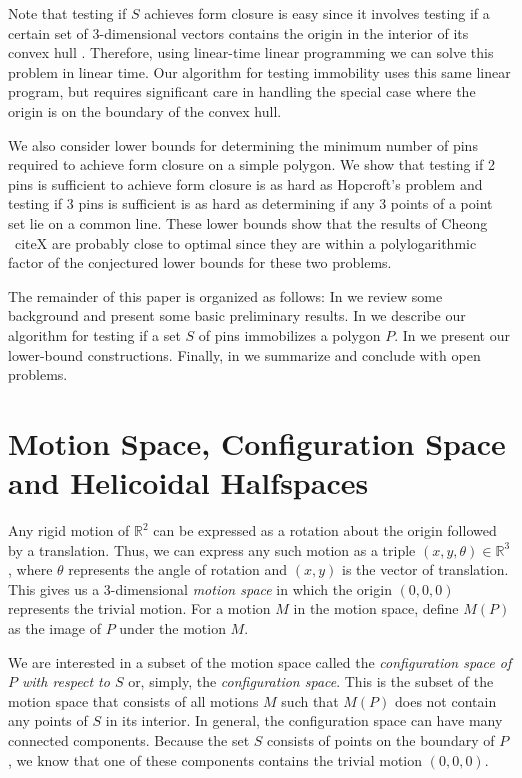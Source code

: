 \documentclass[lotsofwhite,charterfonts]{patmorin}
\newcommand{\Rtwo}{\mathbb{R}^2}
\begin{document}
Note that testing if $S$ achieves form closure is easy since it involves
testing if a certain set of 3-dimensional vectors contains the origin in the
interior of its convex hull \cite{A,B,C,D}.  Therefore, using linear-time
linear programming \cite{X,X} we can solve this problem in linear time.  Our
algorithm for testing immobility uses this same linear program, but requires
significant care in handling the special case where the origin is on the
boundary of the convex hull. 

We also consider lower bounds for determining the minimum number of pins
required to achieve form closure on a simple polygon.  We show that testing if
2 pins is sufficient to achieve form closure is as hard as Hopcroft's problem
and testing if 3 pins is sufficient is as hard as determining if any 3 points
of a point set lie on a common line.  These lower bounds show that the results
of Cheong \etal\ cite{X} are probably close to optimal since they are within a
polylogarithmic factor of the conjectured lower bounds for these two problems.

The remainder of this paper is organized as follows:  In  we
review some background and present some basic preliminary results.  In
 we describe our algorithm for testing if a set $S$ of pins
immobilizes a polygon $P$. In  we present our lower-bound
constructions.  Finally, in  we summarize and conclude with
open problems.

\section{Motion Space, Configuration Space and Helicoidal Halfspaces}

Any rigid motion of $\Rtwo$ can be expressed as a rotation about the origin
followed by a translation.  Thus, we can express any such motion as a triple
$(x,y,\theta)\in \mathbb{R}^3$, where $\theta$ represents the angle of rotation
and $(x,y)$ is the vector of translation.  This gives us a 3-dimensional
\emph{motion space} in which the origin $(0,0,0)$ represents the trivial
motion.  For a motion $M$ in the motion space, define $M(P)$ as the image of
$P$ under the motion $M$.

We are interested in a subset of the motion space called the
\emph{configuration space of $P$ with respect to $S$} or, simply, the
\emph{configuration space}.  This is the subset of the motion space that
consists of all motions $M$ such that $M(P)$ does not contain any points of $S$
in its interior.  In general, the configuration space can have many connected
components.  Because the set $S$ consists of points on the boundary of $P$, we
know that one of these components contains the trivial motion $(0,0,0)$.  
\end{document}

